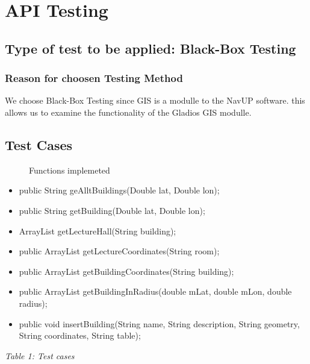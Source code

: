 \documentclass[12pt]{article}
\begin{document}
	

\section{API Testing}
	\subsection{Type of test to be applied: Black-Box Testing}
		\subsubsection{Reason for choosen Testing Method }
		We choose Black-Box Testing since GIS is a modulle to the NavUP software. this allows us to examine the functionality of 
		the Gladios GIS modulle.


	\subsection{Test Cases}
		\begin{description}
			\item[] Functions implemeted
		\end{description}
	\begin{itemize}
		
		\item{public String geAlltBuildings(Double lat, Double lon);}
		
		
		\item{public String getBuilding(Double lat, Double lon);}
		
		
		\item{ArrayList getLectureHall(String building);}
		
		
		\item{public ArrayList getLectureCoordinates(String room);}
		
		
		\item	{public ArrayList getBuildingCoordinates(String building);   }        
		
		\item{public ArrayList getBuildingInRadius(double mLat, double mLon, double radius);}    
		
		\item {public void insertBuilding(String name, String description, String geometry, String coordinates, String table);}
	\end{itemize}

		 \textit{Table 1: Test cases}
		
\end{document}
